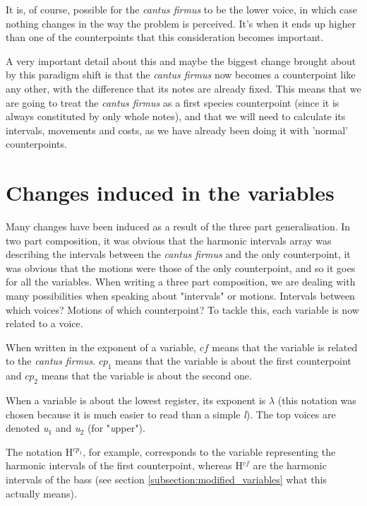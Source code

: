 It is, of course, possible for the \textit{cantus firmus} to be the lower voice, in which case nothing changes in the way the problem is perceived. It's when it ends up higher than one of the counterpoints that this consideration becomes important.

A very important detail about this and maybe the biggest change brought about by this paradigm shift is that the \textit{cantus firmus} now becomes a counterpoint like any other, with the difference that its notes are already fixed. This means that we are going to treat the \textit{cantus firmus} as a first species counterpoint (since it is always constituted by only whole notes), and that we will need to calculate its intervals, movements and costs, as we have already been doing it with 'normal' counterpoints.

\section{Changes induced in the variables} \label{section:changes induced}

Many changes have been induced as a result of the three part generalisation. In two part composition, it was obvious that the harmonic intervals array was describing the intervals between the \textit{cantus firmus} and the only counterpoint, it was obvious that the motions were those of the only counterpoint, and so it goes for all the variables. When writing a three part composition, we are dealing with many possibilities when speaking about "intervals" or motions. Intervals between which voices? Motions of which counterpoint? To tackle this, each variable is now related to a voice.

When written in the exponent of a variable, $cf$ means that the variable is related to the \textit{cantus firmus}. $cp_1$ means that the variable is about the first counterpoint and $cp_2$ means that the variable is about the second one.

When a variable is about the lowest register, its exponent is \textit{$\lambda$} (this notation was chosen because it is much easier to read than a simple \textit{l}). The top voices are denoted \textit{u$_1$} and \textit{u$_2$} (for "\textit{u}pper").

The notation H$^{cp_1}$, for example, corresponds to the variable representing the harmonic intervals of the first counterpoint, whereas H$^{cf}$ are the harmonic intervals of the bass (see section \ref{subsection:modified_variables} what this actually means).

